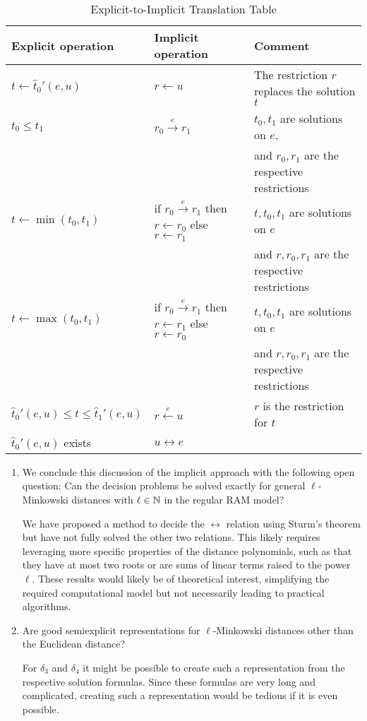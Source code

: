 \begin{table}[htb]
  \centering
	\begin{tabular}{|lll|}
		\hline
		Explicit operation & Implicit operation & Comment\\
		\hline
		\(t \gets \hat t_0'(e, u)\) & \(r \gets u\) & The restriction \(r\) replaces the solution \(t\)\\
		\(t_0 \leq t_1\) & \(r_0 \overset e\rightarrow r_1\) & \(t_0, t_1\) are solutions on \(e\), \\
		& & and \(r_0, r_1\) are the respective restrictions\\
		\(t \gets \min(t_0, t_1)\) & if \(r_0 \overset{e}\rightarrow r_1\) then \(r \gets r_0\) else \(r \gets r_1\) & \(t, t_0, t_1\) are solutions on \(e\) \\
		& & and \(r, r_0, r_1\) are the respective restrictions\\
		\(t \gets \max(t_0, t_1)\) & if \(r_0 \overset{e}\rightarrow r_1\) then \(r \gets r_1\) else \(r \gets r_0\) & \(t, t_0, t_1\) are solutions on \(e\) \\
		& & and \(r, r_0, r_1\) are the respective restrictions\\
		\(\hat t_0'(e, u) \leq t \leq \hat t_1'(e, u)\) & \(r \overset e\leftarrow u\) & \(r\) is the restriction for \(t\)\\
		\(\hat t_0'(e, u)\) exists & \(u \leftrightarrow e\) & \\
		\hline
	\end{tabular}
	\caption{Explicit-to-Implicit Translation Table}
	\label{tab:explicit-implicit-translation}
\end{table}

\begin{enumerate}
	\item We conclude this discussion of the implicit approach with the following open question: Can the decision problems be solved exactly for general \(\ell\)-Minkowski distances with \(\ell \in \mathbb{N}\) in the regular RAM model? 

	We have proposed a method to decide the \(\leftrightarrow\) relation using Sturm's theorem but have not fully solved the other two relations. This likely requires leveraging more specific properties of the distance polynomials, such as that they have at most two roots or are sums of linear terms raised to the power \(\ell\). These results would likely be of theoretical interest, simplifying the required computational model but not necessarily leading to practical algorithms.

	\item Are good semiexplicit representations for \(\ell\)-Minkowski distances other than the Euclidean distance?

	For \(\delta_3\) and \(\delta_4\) it might be possible to create such a representation from the respective solution formulas. Since these formulas are very long and complicated, creating such a representation would be tedious if it is even possible.
\end{enumerate}

